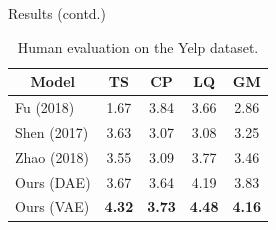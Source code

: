 \documentclass[final]{beamer}
\newlength{\sepwid}
\newlength{\onecolwid}
\newlength{\twocolwid}
\newcommand{\tabc}[2]{\multicolumn{1}{c}{\multirow{#1}{*}{\textbf{#2}}}}
\begin{document}
\begin{frame}[t]
\begin{columns}[t]
\begin{column}{\twocolwid}
\begin{columns}[t,totalwidth=\twocolwid]
\begin{column}{\onecolwid}
\begin{block}{Results (contd.)}
                        \begin{table}[ht]
                            \centering
                            \begin{tabular}{ l c c c c }
                                \tabc{1}{Model} & \textbf{TS}       & \textbf{CP}       & \textbf{LQ}       & \textbf{GM}       \\
                                \hline
                                Fu (2018)       & \color{gray} 1.67 & \color{gray} 3.84 & \color{gray} 3.66 & \color{gray} 2.86 \\
                                Shen (2017)     & 3.63              & 3.07              & 3.08              & 3.25              \\
                                Zhao (2018)     & 3.55              & 3.09              & 3.77              & 3.46              \\
                                Ours (DAE)      & 3.67              & 3.64              & 4.19              & 3.83              \\
                                Ours (VAE)      & \textbf{4.32}     & \textbf{3.73}     & \textbf{4.48}     & \textbf{4.16}     \\
                            \end{tabular}
                            \caption{Human evaluation on the Yelp dataset.}
                            \label{tab:human-evaluation}
                        \end{table}

                    \end{block}


                \end{column} %

            \end{columns} %

        \end{column} %

        \begin{column}{\sepwid}\end{column} %

        \begin{column}{\onecolwid} %



\end{column}
\end{columns}
\end{frame}
\end{document}
